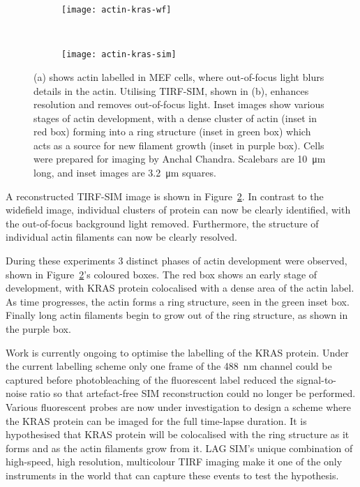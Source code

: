 \begin{figure}[tbp!]
\centering
\begin{subfigure}[b]{0.85\textwidth}
	\texttt{[image: actin-kras-wf]}
	\caption{}\label{fig:widefield-actin}
\end{subfigure}

~\newline
\begin{subfigure}[b]{0.85\textwidth}
	\texttt{[image: actin-kras-sim]}
	\caption{}\label{fig:recon-tirf-actin}
\end{subfigure}
\caption[LAG SIM: TIRF-SIM imaging of actin in MEF cells removes out-of-focus light allowing actin development to be studied]{(a) shows actin labelled in MEF cells, where out-of-focus light blurs details in the actin. Utilising TIRF-SIM, shown in (b), enhances resolution and removes out-of-focus light. Inset images show various stages of actin development, with a dense cluster of actin (inset in red box) forming into a ring structure (inset in green box) which acts as a source for new filament growth (inset in purple box). Cells were prepared for imaging by Anchal Chandra. Scalebars are \SI{10}{\micro\metre} long, and inset images are \SI{3.2}{\micro\metre} squares.}
\label{fig:recon-actin}
\end{figure}
\afterpage{\clearpage}

A reconstructed TIRF-SIM image is shown in Figure~\ref{fig:recon-tirf-actin}.
In contrast to the widefield image, individual clusters of protein can now be clearly identified, with the out-of-focus background light removed.
Furthermore, the structure of individual actin filaments can now be clearly resolved.

During these experiments 3 distinct phases of actin development were observed, shown in Figure~\ref{fig:recon-tirf-actin}'s coloured boxes.
The red box shows an early stage of development, with KRAS protein colocalised with a dense area of the actin label.
As time progresses, the actin forms a ring structure, seen in the green inset box.
Finally long actin filaments begin to grow out of the ring structure, as shown in the purple box.

Work is currently ongoing to optimise the labelling of the KRAS protein.
Under the current labelling scheme only one frame of the \SI{488}{\nano\metre} channel could be captured before photobleaching of the fluorescent label reduced the signal-to-noise ratio so that artefact-free SIM reconstruction could no longer be performed.
Various fluorescent probes are now under investigation to design a scheme where the KRAS protein can be imaged for the full time-lapse duration.
It is hypothesised that KRAS protein will be colocalised with the ring structure as it forms and as the actin filaments grow from it.
LAG SIM's unique combination of high-speed, high resolution, multicolour TIRF imaging make it one of the only instruments in the world that can capture these events to test the hypothesis.


